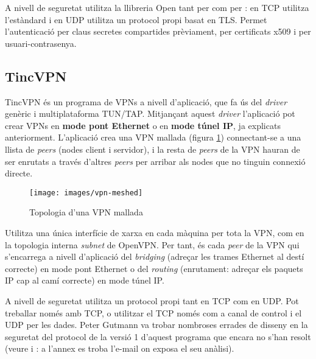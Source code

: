 A nivell de seguretat utilitza la llibreria Open tant per  com per : en TCP utilitza l'estàndard  i en UDP utilitza un protocol propi basat en TLS. Permet l'autenticació per claus secretes compartides prèviament, per certificats x509 i per usuari-contrasenya.

\subsection{TincVPN}
TincVPN és un programa de VPNs a nivell d'aplicació, que fa ús del \emph{driver} genèric i multiplataforma TUN/TAP. Mitjançant aquest \emph{driver} l'aplicació pot crear VPNs en \textbf{mode pont Ethernet} o en \textbf{mode túnel IP}, ja explicats anteriorment. L'aplicació crea una VPN mallada (figura \ref{F:vpn-meshed}) connectant-se a una llista de \emph{peers} (nodes client i servidor), i la resta de \emph{peers} de la VPN hauran de ser enrutats a través d'altres \emph{peers} per arribar als nodes que no tinguin connexió directe.
\begin{figure}[htb]
\centering
\texttt{[image: images/vpn-meshed]}
\caption{Topologia d'una VPN mallada}
\label{F:vpn-meshed}
\end{figure}

Utilitza una única interfície de xarxa en cada màquina per tota la VPN, com en la topologia interna \emph{subnet} de OpenVPN. Per tant, és cada \emph{peer} de la VPN qui s'encarrega a nivell d'aplicació del \emph{bridging} (adreçar les trames Ethernet al destí correcte) en mode pont Ethernet o del \emph{routing} (enrutament: adreçar els paquets IP cap al camí correcte) en mode túnel IP.

\label{TincVPN-Sec}
A nivell de seguretat utilitza un protocol propi tant en TCP com en UDP. Pot treballar només amb TCP, o utilitzar el TCP només com a canal de control i el UDP per les dades. Peter Gutmann va trobar nombroses errades de disseny en la seguretat del protocol de la versió 1 d'aquest programa que encara no s'han resolt (veure \cite{latm-metzdowd} i \cite{tinc-sec}: a l'annex  es troba l'e-mail on exposa el seu anàlisi).


